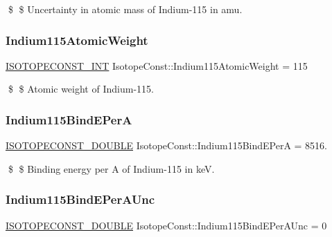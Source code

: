 \$ \$ Uncertainty in atomic mass of Indium-\/115 in amu. \mbox{\label{group___isotope_const-_indium-_in115_ga2bac7bd11585b10be52aea5224234eb7}} 
\subsubsection{\texorpdfstring{Indium115\+Atomic\+Weight}{Indium115AtomicWeight}}
{\footnotesize\ttfamily \mbox{\hyperlink{group___isotope_const-_macros_ga5f18360b3e99483a35c32d789e62621c}{I\+S\+O\+T\+O\+P\+E\+C\+O\+N\+S\+T\+\_\+\+I\+NT}} Isotope\+Const\+::\+Indium115\+Atomic\+Weight = 115}

\$ \$ Atomic weight of Indium-\/115. \mbox{\label{group___isotope_const-_indium-_in115_ga6c729b013500e4c70b881a618401bf4f}} 
\subsubsection{\texorpdfstring{Indium115\+Bind\+E\+PerA}{Indium115BindEPerA}}
{\footnotesize\ttfamily \mbox{\hyperlink{group___isotope_const-_macros_ga8f45a7272ce02c0b4c65c44636ed719a}{I\+S\+O\+T\+O\+P\+E\+C\+O\+N\+S\+T\+\_\+\+D\+O\+U\+B\+LE}} Isotope\+Const\+::\+Indium115\+Bind\+E\+PerA = 8516.}

\$ \$ Binding energy per A of Indium-\/115 in keV. \mbox{\label{group___isotope_const-_indium-_in115_ga089b78c3ee92ca35f19f5b07517318bf}} 
\subsubsection{\texorpdfstring{Indium115\+Bind\+E\+Per\+A\+Unc}{Indium115BindEPerAUnc}}
{\footnotesize\ttfamily \mbox{\hyperlink{group___isotope_const-_macros_ga8f45a7272ce02c0b4c65c44636ed719a}{I\+S\+O\+T\+O\+P\+E\+C\+O\+N\+S\+T\+\_\+\+D\+O\+U\+B\+LE}} Isotope\+Const\+::\+Indium115\+Bind\+E\+Per\+A\+Unc = 0}

